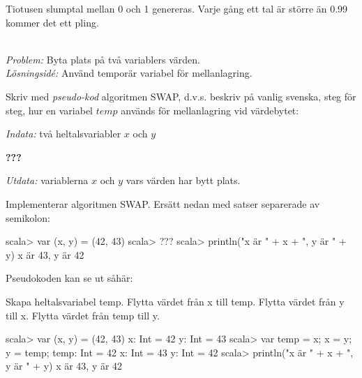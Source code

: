 \SubtaskSolved  Tiotusen slumptal mellan 0 och 1 genereras. Varje gång ett tal är större än 0.99 kommer det ett pling.



\QUESTEND









\QUESTBEGIN

\Task  \what~\\\emph{Problem:} Byta plats på två variablers värden. \\\emph{Lösningsidé:} Använd temporär variabel för mellanlagring.

\Subtask Skriv med \emph{pseudo-kod} algoritmen SWAP, d.v.s. beskriv på vanlig svenska, steg för steg, hur en variabel $temp$ används för mellanlagring vid värdebytet:

\emph{Indata:} två heltalsvariabler $x$ och $y$

\textbf{???}

\emph{Utdata:} variablerna $x$ och $y$ vars värden har bytt plats.

\Subtask Implementerar algoritmen SWAP. Ersätt  nedan med satser separerade av semikolon:

\begin{REPL}
scala> var (x, y) = (42, 43)
scala> ???
scala> println("x är " + x + ", y är " + y)
x är 43, y är 42
\end{REPL}



\SOLUTION


\TaskSolved \what


\SubtaskSolved  Pseudokoden kan se ut såhär:

Skapa heltalsvariabel temp.
Flytta värdet från x till temp.
Flytta värdet från y till x.
Flytta värdet från temp till y.

\SubtaskSolved
\begin{REPLnonum}
scala> var (x, y) = (42, 43)
x: Int = 42
y: Int = 43
scala> var temp = x; x = y; y = temp;
temp: Int = 42
x: Int = 43
y: Int = 42
scala> println("x är " + x + ", y är " + y)
x är 43, y är 42
\end{REPLnonum}



\QUESTEND






